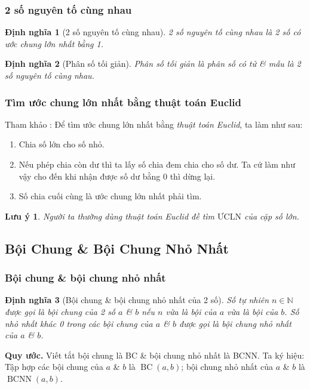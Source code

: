 \documentclass{article}
\numberwithin{equation}{section}
\newtheorem{definition}{Định nghĩa}[section]
\newtheorem{remark}{Lưu ý}[section]
\begin{document}
\subsubsection{2 số nguyên tố cùng nhau}

\begin{definition}[2 số nguyên tố cùng nhau]
	\emph{2 số nguyên tố cùng nhau} là 2 số có ước chung lớn nhất bằng 1.
\end{definition}

\begin{definition}[Phân số tối giản]
	\emph{Phân số tối giản} là phân số có tử \& mẫu là 2 số nguyên tố cùng nhau.
\end{definition}

\subsubsection{Tìm ước chung lớn nhất bằng thuật toán Euclid}
Tham khảo \cite[p. 52]{Thai_Anh_Dat_Ha_Loan_Nam_Quang_Toan_6_tap_1}: Để tìm ước chung lớn nhất bằng \textit{thuật toán Euclid}, ta làm như sau:
\begin{enumerate}
	\item Chia số lớn cho số nhỏ.
	\item Nếu phép chia còn dư thì ta lấy số chia đem chia cho số dư. Ta cứ làm như vậy cho đến khi nhận được số dư bằng 0 thì dừng lại.
	\item Số chia cuối cùng là ước chung lớn nhất phải tìm.
\end{enumerate}

\begin{remark}
	Người ta thường dùng thuật toán Euclid đề tìm $\mbox{ƯCLN}$ của cặp số lớn.
\end{remark}

\subsection{Bội Chung \& Bội Chung Nhỏ Nhất}

\subsubsection{Bội chung \& bội chung nhỏ nhất}

\begin{definition}[Bội chung \& bội chung nhỏ nhất của 2 số]
	Số tự nhiên $n\in\mathbb{N}$ được gọi là \emph{bội chung} của 2 số $a$ \& $b$ nếu $n$ vừa là bội của $a$ vừa là bội của $b$. Số nhỏ nhất khác 0 trong các bội chung của $a$ \& $b$ được gọi là \emph{bội chung nhỏ nhất} của $a$ \& $b$.
\end{definition}
\noindent\textbf{Quy ước.} Viết tắt bội chung là BC \& bội chung nhỏ nhất là BCNN. Ta ký hiệu: Tập hợp các bội chung của $a$ \& $b$ là $\operatorname{BC}(a,b)$; bội chung nhỏ nhất của $a$ \& $b$ là $\operatorname{BCNN}(a,b)$.  
\end{document}
